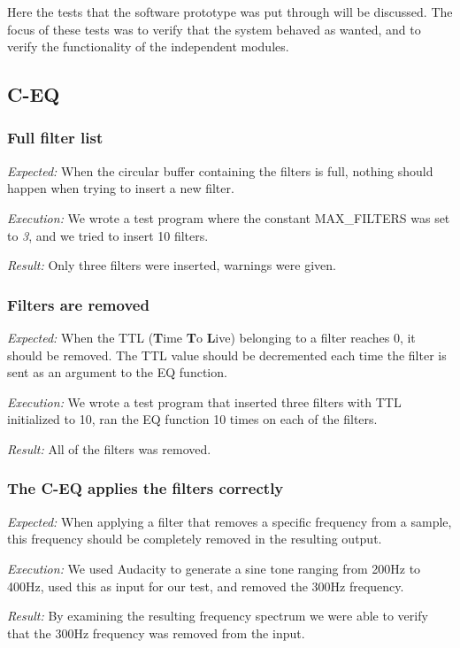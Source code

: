 Here the tests that the software prototype was put through will be discussed. The focus of these tests was to verify that the system behaved as wanted, and to verify the functionality of the independent modules. 

\subsection{C-EQ}
\subsubsection{Full filter list}
\emph{Expected:}
When the circular buffer containing the filters is full, nothing should happen when trying to insert a new filter.

\emph{Execution:}
We wrote a test program where the constant {\ttfamily MAX\_FILTERS} was set to \emph{3}, and we tried to insert 10 filters.

\emph{Result:}
Only three filters were inserted, warnings were given.

\subsubsection{Filters are removed}
\emph{Expected: }
When the TTL (\textbf{T}ime \textbf{T}o \textbf{L}ive) belonging to a filter reaches 0, it should be removed. The TTL value should be decremented each time the filter is sent as an argument to the EQ function.

\emph{Execution:}
We wrote a test program that inserted three filters with TTL initialized to 10, ran the EQ function 10 times on each of the filters.

\emph{Result:}
All of the filters was removed.

\subsubsection{The C-EQ applies the filters correctly}
\emph{Expected:}
When applying a filter that removes a specific frequency from a sample, this frequency should be completely removed in the resulting output.

\emph{Execution:}
We used Audacity to generate a sine tone ranging from 200Hz to 400Hz, used this as input for our test, and removed the 300Hz frequency.

\emph{Result:}
By examining the resulting frequency spectrum we were able to verify that the 300Hz frequency was removed from the input.

